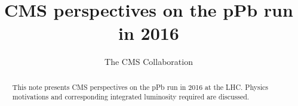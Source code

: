 \documentclass[12pt]{article}
\title{CMS perspectives on the pPb run in 2016}
\author
{ The CMS Collaboration }
\date{}
\begin{document}
 


\baselineskip24pt


\maketitle 


\begin{abstract}

This note presents CMS perspectives on the pPb run in 2016 at the LHC. 
Physics motivations and corresponding integrated luminosity required are discussed.



\end{abstract}














\clearpage
\end{document}
